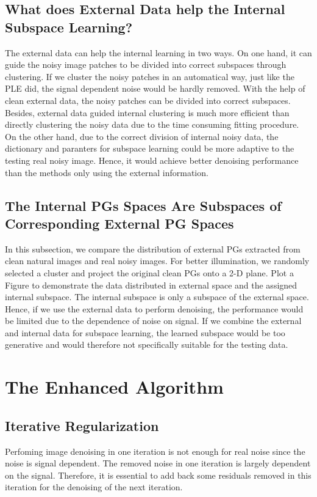 \documentclass[10pt,twocolumn,letterpaper]{article}
\begin{document}
\subsection{What does External Data help the Internal Subspace Learning?}
The external data can help the internal learning in two ways. On one hand, it can guide the noisy image patches to be divided into correct subspaces through clustering. If we cluster the noisy patches in an automatical way, just like the PLE \cite{ple} did, the signal dependent noise would be hardly removed. With the help of clean external data, the noisy patches can be divided into correct subspaces. Besides, external data guided internal clustering is much more efficient than directly clustering the noisy data due to the time consuming fitting procedure. On the other hand, due to the correct division of internal noisy data, the dictionary and paranters for subspace learning could be more adaptive to the testing real noisy image. Hence, it would achieve better denoising performance than the methods only using the external information.

\subsection{The Internal PGs Spaces Are Subspaces of Corresponding External PG Spaces}
In this subsection, we compare the distribution of external PGs extracted from clean natural images and real noisy images. For better illumination, we randomly selected a cluster and project the original clean PGs onto a 2-D plane. Plot a Figure to demonstrate the data distributed in external space and the assigned internal subspace. The internal subspace is only a subspace of the external space. Hence, if we use the external data to perform denoising, the performance would be limited due to the dependence of noise on signal. If we combine the external and internal data for subspace learning, the learned subspace would be too generative and would therefore not specifically suitable for the testing data. 

\section{The Enhanced Algorithm}

\subsection{Iterative Regularization}
Perfoming image denoising in one iteration is not enough for real noise since the noise is signal dependent. The removed noise in one iteration is largely dependent on the signal. Therefore, it is essential to add back some residuals removed in this iteration for the denoising of the next iteration. 
\end{document}
